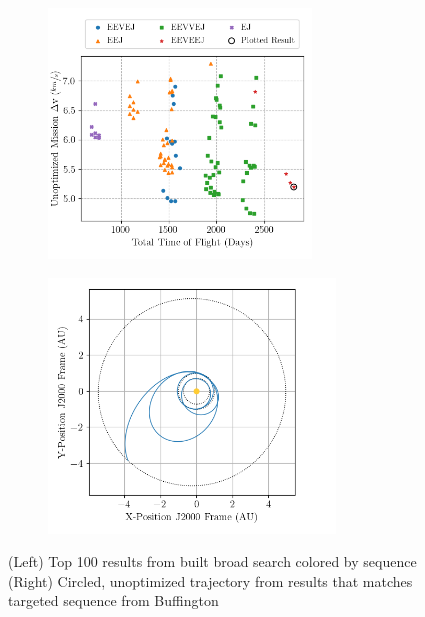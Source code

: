 \documentclass[letterpaper, preprint, paper,11pt]{AAS}	%
\begin{document}
\begin{figure}[htb]
    \begin{subfigure}
        \centering\includegraphics[width=2.75in]{./fig/clipperResults.png}
    \end{subfigure}
    \begin{subfigure}
        \centering\includegraphics[width=3in]{./fig/clipperMCTS.png}
    \end{subfigure}
    \caption{(Left) Top 100 results from built broad search colored by sequence\hspace{1em} (Right) Circled, unoptimized trajectory from results that matches targeted sequence from Buffington \cite{Buffington2014}}
    \label{fig:clipResults}
\end{figure}
\end{document}
